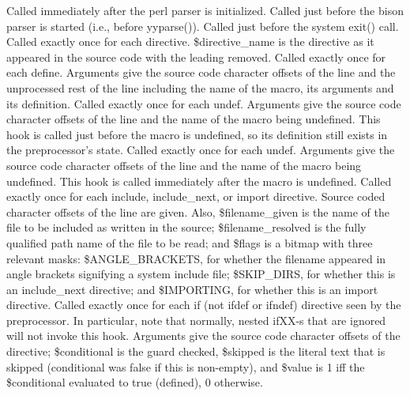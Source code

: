  Called immediately after the perl parser is initialized.
 Called just before the bison parser is started (i.e., before yyparse()).
 Called just before the system exit() call.
 Called exactly once for each directive.  \$directive\_\-name is
the directive as it appeared in the source code with the leading \pphash{} removed.
 Called exactly once for each \pphash{}define. 
Arguments give the source code character offsets of the line and the 
unprocessed rest of the line including the name of the macro, its arguments
and its definition.
 Called exactly once for each \pphash{}undef.
Arguments give the source code character offsets of the line and the
name of the macro being undefined.  This hook is called just before
the macro is undefined, so its definition still exists 
in the preprocessor's state.
 Called exactly once for each \pphash{}undef.
Arguments give the source code character offsets of the line and the
name of the macro being undefined.  This hook is called immediately after
the macro is undefined.
Called exactly once for each \pphash{}include,
\pphash{}include\_\-next, or \pphash{}import directive.  Source coded character offsets of
the line are given. Also, \$filename\_\-given is the name of the
file to be included as written in the source;  \$filename\_\-resolved is the
fully qualified path name of the file to be read; and  \$flags is a bitmap
with three relevant masks:  \$ANGLE\_\-BRACKETS, for whether the filename appeared
in angle brackets signifying a system include file; \$SKIP\_\-DIRS, for whether this
is an \pphash{}include\_\-next directive; and \$IMPORTING, for whether this is an \pphash{}import
directive.
Called exactly once for each \pphash{}if 
(not \pphash{}ifdef or \pphash{}ifndef) directive seen by the preprocessor. In particular,
note that normally, nested \pphash{}ifXX-s that are ignored will not invoke this hook.
Arguments give the source code character
offsets of the directive; \$conditional is the guard checked, \$skipped is
the literal text that is skipped (conditional was false if this is non-empty), and
\$value is 1 iff the \$conditional evaluated to true (defined), 0 otherwise.
